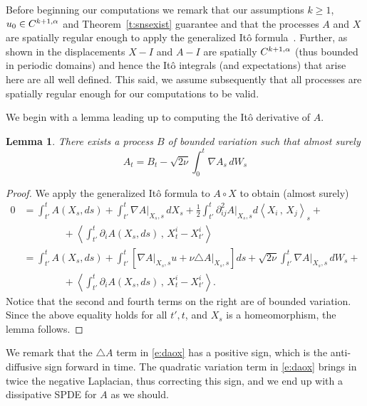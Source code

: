 \documentclass[final]{amsart}%
\newcommand{\del}{\partial}
\newcommand{\lap}{\triangle}
\newcommand{\geqs}{\geqslant}
\newcommand{\grad}{\nabla}
\newcommand{\at}[1]{\big|_{#1}}
\newcommand{\Ifn}{I}
\newcommand{\holderspace}[2]{\ensuremath{C^{\ifx0#1{#2}\else{#1,#2}\fi}}}
\newif\iftextstyle
\newcommand{\qv}[2]{\iftextstyle\langle#1,#2\rangle\else\left\langle#1\,,\,#2\right\rangle\fi}
\numberwithin{equation}{section}
\newtheorem{lemma}[theorem]{Lemma}
\theoremstyle{definition}
\theoremstyle{remark}
\begin{document}
Before beginning our computations we remark that our assumptions $k\geqs 1$, $u_0 \in \holderspace{k+1}{\alpha}$ and Theorem~\ref{t:snsexist} guarantee and that the processes $A$ and $X$ are spatially regular enough to apply the generalized It\^o formula~\cite{kunita}. Further, as shown in \cite{sperturb} the displacements $X-\Ifn$ and $A-\Ifn$ are spatially $\holderspace{k+1}{\alpha}$ (thus bounded in periodic domains) and hence the It\^o integrals (and expectations) that arise here are all well defined. This said, we assume subsequently that all processes are spatially regular enough for our computations to be valid.

We begin with a lemma leading up to computing the It\^o derivative of $A$.
\begin{lemma}\label{l:mpart-a}%
There exists a process $B$ of bounded variation such that almost surely
\begin{equation}
\label{e:mpart-a} A_t = B_t - \sqrt{2\nu}\int_0^t \grad A_s \,dW_s
\end{equation}
\end{lemma}
\begin{proof}%
We apply the generalized It\^o formula to $A \circ X$ to obtain (almost surely)
\begin{align}
\nonumber 0 &= \int_{t'}^t A(X_s, ds) + \int_{t'}^t \grad A\at{X_s,s} \,dX_s + \tfrac{1}{2}\int_{t'}^t \del^2_{ij} A\at{X_s, s} d\qv{X_i}{X_j}_s + \\
\nonumber     &\qquad\qquad + \qv{\int_{t'}^t \del_i A(X_s, ds)}{X^i_t - X^i_{t'}}\\
\label{e:daox} &= \int_{t'}^t A(X_s, ds) + \int_{t'}^t \left[\grad A\at{X_s,s} u + \nu\lap A\at{X_s, s} \right]ds + \sqrt{2\nu}\int_{t'}^t \grad A\at{X_s,s} \,dW_s + \\
\nonumber    &\qquad\qquad + \qv{\int_{t'}^t \del_i A(X_s, ds)}{X^i_t - X^i_{t'}}.
\end{align}
Notice that the second and fourth terms on the right are of bounded variation. Since the above equality holds for all $t', t$, and $X_s$ is a homeomorphism, the lemma follows.
\end{proof}%

We remark that the $\lap A$ term in \eqref{e:daox} has a positive sign, which is the anti-diffusive sign forward in time. The quadratic variation term in \eqref{e:daox} brings in twice the negative Laplacian, thus correcting this sign, and we end up with  a dissipative SPDE for $A$ as we should.
\end{document}
